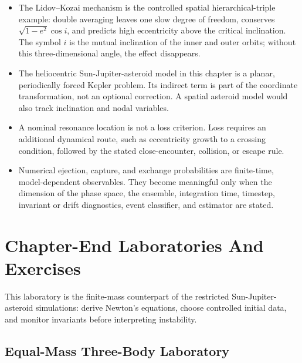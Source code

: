 \begin{itemize}
binary-single scattering all use the same ideas: a reference two-body motion
when one exists, a perturbing third body, resonant or secular exchange, and a
finite-time stability, capture, exchange, or ejection observable. Some of these
applications are intrinsically spatial, especially hierarchical triples with
inclination dynamics.  Planar slices remain useful when they are announced as
controlled reductions.
\item The Lidov--Kozai mechanism is the controlled spatial hierarchical-triple
example: double averaging leaves one slow degree of freedom, conserves
\(\sqrt{1-e^2}\cos i\), and predicts high eccentricity above the critical
inclination.  The symbol \(i\) is the mutual inclination of the inner and outer
orbits; without this three-dimensional angle, the effect disappears.
\item The heliocentric Sun-Jupiter-asteroid model in this chapter is a planar,
periodically forced Kepler problem.  Its indirect term is part of the
coordinate transformation, not an optional correction. A spatial asteroid model
would also track inclination and nodal variables.
\item A nominal resonance location is not a loss criterion.  Loss requires an
additional dynamical route, such as eccentricity growth to a crossing condition,
followed by the stated close-encounter, collision, or escape rule.
\item Numerical ejection, capture, and exchange probabilities are finite-time,
model-dependent observables. They become meaningful only when the dimension
of the phase space, the ensemble, integration time, timestep, invariant or
drift diagnostics, event classifier, and estimator are stated.
\end{itemize}

\section{Chapter-End Laboratories And Exercises}
\label{sec:three-body-chapter-end-labs}

This laboratory is the finite-mass counterpart of the restricted
Sun-Jupiter-asteroid simulations: derive Newton's equations, choose controlled
initial data, and monitor invariants before interpreting instability.

\subsection{Equal-Mass Three-Body Laboratory}
\label{sec:lab-three-body}

